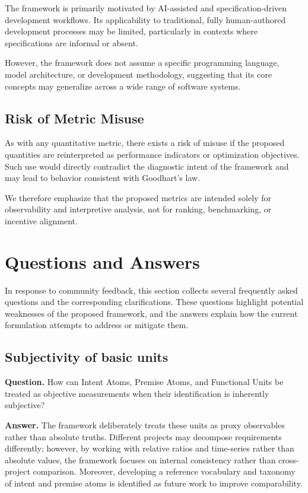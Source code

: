 \documentclass[twocolumn]{aastex701}
\begin{document}
The framework is primarily motivated by AI-assisted and
specification-driven development workflows.
Its applicability to traditional, fully human-authored development
processes may be limited, particularly in contexts where specifications
are informal or absent.

However, the framework does not assume a specific programming language,
model architecture, or development methodology,
suggesting that its core concepts may generalize across a wide range
of software systems.

\subsection{Risk of Metric Misuse}

As with any quantitative metric, there exists a risk of misuse if the
proposed quantities are reinterpreted as performance indicators or
optimization objectives.
Such use would directly contradict the diagnostic intent of the
framework and may lead to behavior consistent with Goodhart's law.

We therefore emphasize that the proposed metrics are intended solely
for observability and interpretive analysis,
not for ranking, benchmarking, or incentive alignment.

\section{Questions and Answers}
\label{sec:q-and-a}

In response to community feedback, this section collects several
frequently asked questions and the corresponding clarifications.
These questions highlight potential weaknesses of the proposed framework,
and the answers explain how the current formulation attempts to address
or mitigate them.

\subsection{Subjectivity of basic units}
\textbf{Question.} How can Intent Atoms, Premise Atoms, and Functional Units be
treated as objective measurements when their identification is
inherently subjective?

\textbf{Answer.} The framework deliberately treats these units as proxy
observables rather than absolute truths.  Different projects may
decompose requirements differently; however, by working with relative
ratios and time-series rather than absolute values, the framework
focuses on internal consistency rather than cross-project comparison.
Moreover, developing a reference vocabulary and taxonomy of intent and
premise atoms is identified as future work to improve comparability.
\end{document}
